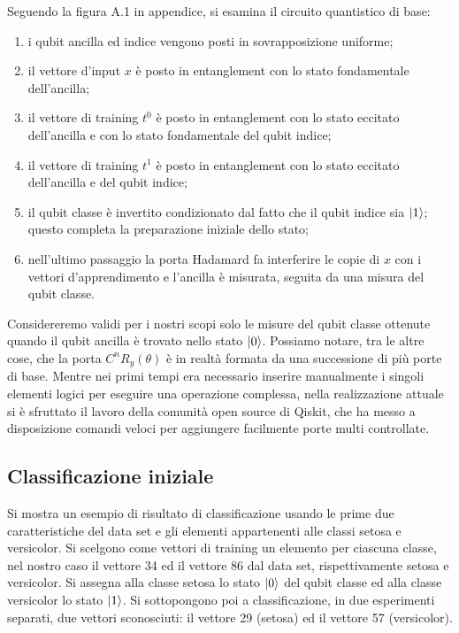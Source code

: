 Seguendo la figura A.1 in appendice, si 
esamina il circuito quantistico di base: 
\begin{enumerate}
    \item i qubit ancilla ed indice vengono posti in sovrapposizione uniforme; 
    \item il vettore d'input $x$ è posto in entanglement con lo stato fondamentale 
    dell'ancilla;
    \item il vettore di training $t^0$ è posto in entanglement con lo stato eccitato 
    dell'ancilla e con lo stato fondamentale del qubit indice;
    \item il vettore di training $t^1$ è posto in entanglement con lo stato eccitato 
    dell'ancilla e del qubit indice;
    \item il qubit classe è invertito condizionato dal fatto che il qubit indice sia $\ket{1}$; 
    questo completa la preparazione iniziale dello stato; 
    \item nell'ultimo passaggio la porta Hadamard fa interferire le copie di $x$ con i vettori 
    d'apprendimento e l'ancilla è misurata, seguita da una misura del qubit classe. 
\end{enumerate}
Considereremo validi per i nostri scopi solo le misure del qubit classe ottenute quando il 
qubit ancilla è trovato nello stato $\ket{0}$. 
Possiamo notare, tra le altre cose, che la porta $C^n R_y (\theta)$ è in 
realtà formata da una successione di più porte di base. Mentre nei primi tempi 
era necessario inserire manualmente i singoli elementi logici per eseguire una operazione 
complessa, nella realizzazione attuale si è sfruttato il lavoro della comunità 
open source di Qiskit, che ha messo a disposizione comandi veloci per aggiungere 
facilmente porte multi controllate. 

\subsection{Classificazione iniziale}

Si mostra un esempio di risultato di classificazione usando le prime due caratteristiche 
del data set e gli elementi appartenenti alle classi setosa e versicolor. 
Si scelgono come vettori di training un elemento per ciascuna classe, nel nostro caso 
il vettore 34 ed il vettore 86 dal data set, rispettivamente setosa e versicolor. 
Si assegna alla classe setosa lo stato $\ket{0}$ del qubit classe ed alla classe 
versicolor lo stato $\ket{1}$. 
Si sottopongono poi a classificazione, in due esperimenti separati, due vettori sconosciuti: 
il vettore 29 (setosa) ed il vettore 57 (versicolor). 

